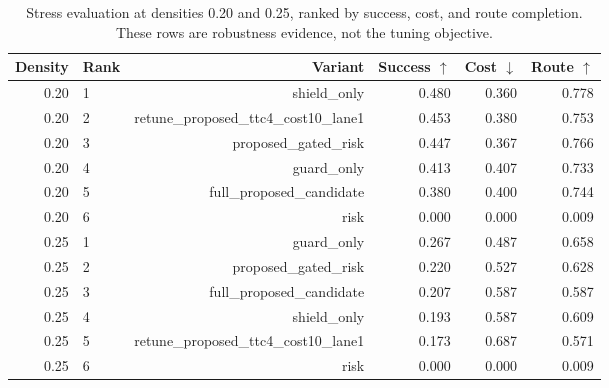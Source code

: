 \begin{table}[t]
\centering
\small
\begin{tabular}{rlrrrr}
\toprule
Density & Rank & Variant & Success $\uparrow$ & Cost $\downarrow$ & Route $\uparrow$ \\
\midrule
0.20 & 1 & shield\_only & 0.480 & 0.360 & 0.778 \\
0.20 & 2 & retune\_proposed\_ttc4\_cost10\_lane1 & 0.453 & 0.380 & 0.753 \\
0.20 & 3 & proposed\_gated\_risk & 0.447 & 0.367 & 0.766 \\
0.20 & 4 & guard\_only & 0.413 & 0.407 & 0.733 \\
0.20 & 5 & full\_proposed\_candidate & 0.380 & 0.400 & 0.744 \\
0.20 & 6 & risk & 0.000 & 0.000 & 0.009 \\
0.25 & 1 & guard\_only & 0.267 & 0.487 & 0.658 \\
0.25 & 2 & proposed\_gated\_risk & 0.220 & 0.527 & 0.628 \\
0.25 & 3 & full\_proposed\_candidate & 0.207 & 0.587 & 0.587 \\
0.25 & 4 & shield\_only & 0.193 & 0.587 & 0.609 \\
0.25 & 5 & retune\_proposed\_ttc4\_cost10\_lane1 & 0.173 & 0.687 & 0.571 \\
0.25 & 6 & risk & 0.000 & 0.000 & 0.009 \\
\bottomrule
\end{tabular}
\caption{Stress evaluation at densities 0.20 and 0.25, ranked by success, cost, and route completion. These rows are robustness evidence, not the tuning objective.}
\label{tab:stress-ranked}
\end{table}
